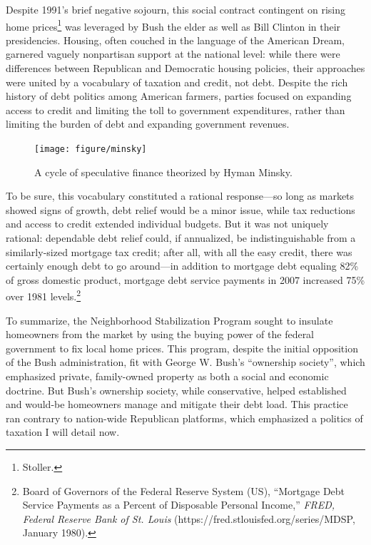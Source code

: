 \documentclass[12pt,oneside]{psthesis}
\begin{document}
Despite 1991's brief negative sojourn, this social contract contingent on rising home prices\footnote{Stoller.} was leveraged by Bush the elder as well as Bill Clinton in their presidencies.
Housing, often couched in the language of the American Dream, garnered vaguely nonpartisan support at the national level: while there were differences between Republican and Democratic housing policies, their approaches were united by a vocabulary of taxation and credit, not debt.
Despite the rich history of debt politics among American farmers, parties focused on expanding access to credit and limiting the toll to government expenditures, rather than limiting the burden of debt and expanding government revenues.
\begin{figure}

{\centering \texttt{[image: figure/minsky]} 

}

\caption{A cycle of speculative finance theorized by Hyman Minsky.}\label{fig:minsky}
\end{figure}
To be sure, this vocabulary constituted a rational response---so long as markets showed signs of growth, debt relief would be a minor issue, while tax reductions and access to credit extended individual budgets.
But it was not uniquely rational: dependable debt relief could, if annualized, be indistinguishable from a similarly-sized mortgage tax credit; after all, with all the easy credit, there was certainly enough debt to go around---in addition to mortgage debt equaling 82\% of gross domestic product, mortgage debt service payments in 2007 increased 75\% over 1981 levels.\footnote{Board of Governors of the Federal Reserve System (US), ``Mortgage Debt Service Payments as a Percent of Disposable Personal Income,'' \emph{FRED, Federal Reserve Bank of St. Louis} (https://fred.stlouisfed.org/series/MDSP, January 1980).}

To summarize, the Neighborhood Stabilization Program sought to insulate homeowners from the market by using the buying power of the federal government to fix local home prices.
This program, despite the initial opposition of the Bush administration, fit with George W. Bush's ``ownership society'', which emphasized private, family-owned property as both a social and economic doctrine.
But Bush's ownership society, while conservative, helped established and would-be homeowners manage and mitigate their debt load.
This practice ran contrary to nation-wide Republican platforms, which emphasized a politics of taxation I will detail now.
\end{document}
